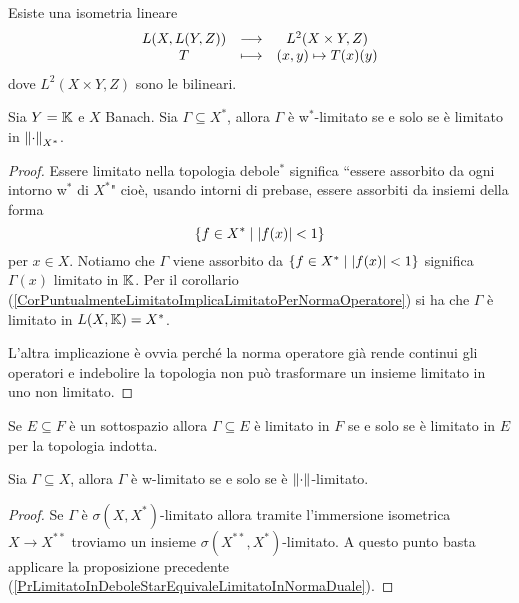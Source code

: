 \begin{exercise}
Esiste una isometria lineare
\[\begin{array}{ccc} {L(X,L(Y,Z))} & \longrightarrow & {L^2(X\times Y,Z)}\\ {T} & \longmapsto & {(x,y)\mapsto T(x)(y)} \end{array}\]
dove $L^2(X\times Y,Z)$ sono le bilineari.
\end{exercise}

\begin{proposition}\label{PrLimitatoInDeboleStarEquivaleLimitatoInNormaDuale}
Sia $Y=\mathbb{K}$ e $X$ Banach. Sia $\Gamma\subseteq X^\ast$, allora $\Gamma$ \`e w$^\ast$-limitato se e solo se \`e limitato in $\left\Vert{\cdot}\right\Vert_{X^\ast}$.
\end{proposition}
\begin{proof}
Essere limitato nella topologia debole$^\ast$ significa ``essere assorbito da ogni intorno w$^\ast$ di $X^\ast$" cio\`e, usando intorni di prebase, essere assorbiti da insiemi della forma
\[\left\{{f\in X^\ast\mid \left|{f(x)}\right|<1}\right\}\]
per $x\in X$. Notiamo che $\Gamma$ viene assorbito da $\left\{{f\in X^\ast\mid \left|{f(x)}\right|<1}\right\}$ significa $\Gamma(x)$ limitato in $\mathbb{K}$. Per il corollario (\ref{CorPuntualmenteLimitatoImplicaLimitatoPerNormaOperatore}) si ha che $\Gamma$ \`e limitato in $L(X,\mathbb{K})=X^\ast$.

L'altra implicazione \`e ovvia perch\'e la norma operatore gi\`a rende continui gli operatori e indebolire la topologia non pu\`o trasformare un insieme limitato in uno non limitato.
\end{proof}

\begin{remark}
Se $E\subseteq F$ \`e un sottospazio allora $\Gamma\subseteq E$ \`e limitato in $F$ se e solo se \`e limitato in $E$ per la topologia indotta.
\end{remark}

\begin{proposition}
Sia $\Gamma\subseteq X$, allora $\Gamma$ \`e w-limitato se e solo se \`e $\left\Vert{\cdot}\right\Vert$-limitato.
\end{proposition}
\begin{proof}
Se $\Gamma$ \`e $\sigma(X,X^\ast)$-limitato allora tramite l'immersione isometrica $X\to X^{\ast\ast}$ troviamo un insieme $\sigma(X^{\ast\ast},X^\ast)$-limitato. A questo punto basta applicare la proposizione precedente (\ref{PrLimitatoInDeboleStarEquivaleLimitatoInNormaDuale}).
\end{proof}

